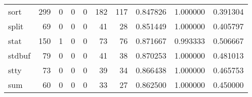 \begin{tabular}{lrrrrrrrrr}
sort      &                                       299 &                                                  0 &                                                  0 &                                                  0 &                                                182 &                                                117 &                                           0.847826 &                               1.000000 &                             0.391304 \\
split     &                                        69 &                                                  0 &                                                  0 &                                                  0 &                                                 41 &                                                 28 &                                           0.851449 &                               1.000000 &                             0.405797 \\
stat      &                                       150 &                                                  1 &                                                  0 &                                                  0 &                                                 73 &                                                 76 &                                           0.871667 &                               0.993333 &                             0.506667 \\
stdbuf    &                                        79 &                                                  0 &                                                  0 &                                                  0 &                                                 41 &                                                 38 &                                           0.870253 &                               1.000000 &                             0.481013 \\
stty      &                                        73 &                                                  0 &                                                  0 &                                                  0 &                                                 39 &                                                 34 &                                           0.866438 &                               1.000000 &                             0.465753 \\
sum       &                                        60 &                                                  0 &                                                  0 &                                                  0 &                                                 33 &                                                 27 &                                           0.862500 &                               1.000000 &                             0.450000 \\

\end{tabular}
